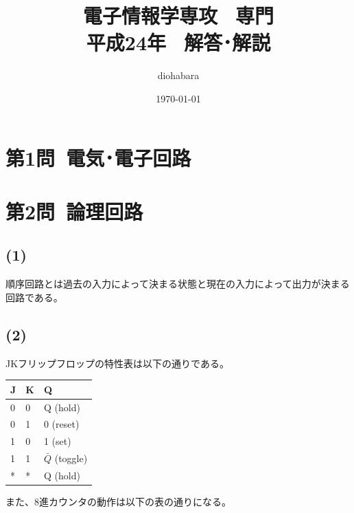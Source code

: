 \documentclass[a4paper,12pt,xelatex,ja=standard]{bxjsarticle}
\title{電子情報学専攻 \, 専門 \\ 平成24年 \, 解答･解説}
\author{diohabara}
\date{\today}
\begin{document}
\maketitle

\section*{第1問\ 電気･電子回路}

\section*{第2問\ 論理回路}
\subsection*{(1)}
順序回路とは過去の入力によって決まる状態と現在の入力によって出力が決まる回路である。

\subsection*{(2)}

JKフリップフロップの特性表は以下の通りである。

\begin{table}[H]
  \begin{tabular}{|l|l|l|}
  \hline
  J & K & Q                  \\ \hline \hline
  0 & 0 & Q (hold)           \\ \hline
  0 & 1 & 0 (reset)          \\ \hline
  1 & 0 & 1 (set)            \\ \hline
  1 & 1 & $\bar{Q}$ (toggle) \\ \hline
  * & * & Q (hold)           \\ \hline
  \end{tabular}
\end{table}

また、8進カウンタの動作は以下の表の通りになる。
\end{document}
